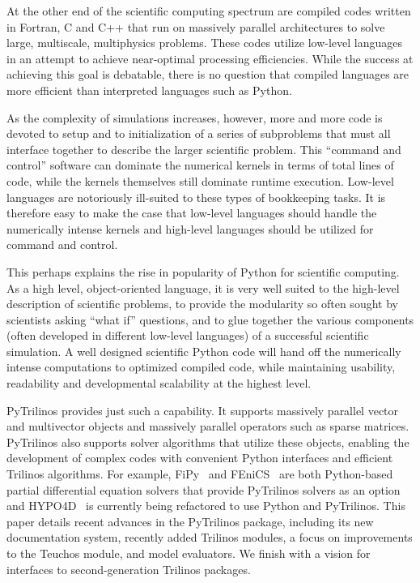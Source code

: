 \documentclass[11pt]{article}
\begin{document}
At the other end of the scientific computing spectrum are compiled codes written in Fortran, C and C++ that run on massively parallel architectures to solve large, multiscale, multiphysics problems.  These codes utilize low-level languages in an attempt to achieve near-optimal processing efficiencies.  While the success at achieving this goal is debatable, there is no question that compiled languages are more efficient than interpreted languages such as Python.

As the complexity of simulations increases, however, more and more code is devoted to setup and to initialization of a series of subproblems that must all interface together to describe the larger scientific problem.  This ``command and control'' software can dominate the numerical kernels in terms of total lines of code, while the kernels themselves still dominate runtime execution.  Low-level languages are notoriously ill-suited to these types of bookkeeping tasks.  It is therefore easy to make the case that low-level languages should handle the numerically intense kernels and high-level languages should be utilized for command and control.

This perhaps explains the rise in popularity of Python for scientific computing.  As a high level, object-oriented language, it is very well suited to the high-level description of scientific problems, to provide the modularity so often sought by scientists asking ``what if'' questions, and to glue together the various components (often developed in different low-level languages) of a successful scientific simulation.  A well designed scientific Python code will hand off the numerically intense computations to optimized compiled code, while maintaining usability, readability and developmental scalability at the highest level.

PyTrilinos provides just such a capability.  It supports massively parallel vector and multivector objects and massively parallel operators such as sparse matrices.  PyTrilinos also supports solver algorithms that utilize these objects, enabling the development of complex codes with convenient Python interfaces and efficient Trilinos algorithms.  For example, FiPy~\cite{FiPy,FiPy_Site} and FEniCS~\cite{FEniCS} are both Python-based partial differential equation solvers that provide PyTrilinos solvers as an option and HYPO4D~\cite{HYPO4D} is currently being refactored to use Python and PyTrilinos.  This paper details recent advances in the PyTrilinos package, including its new documentation system, recently added Trilinos modules, a focus on improvements to the Teuchos module, and model evaluators.  We finish with a vision for interfaces to second-generation Trilinos packages.
\end{document}
